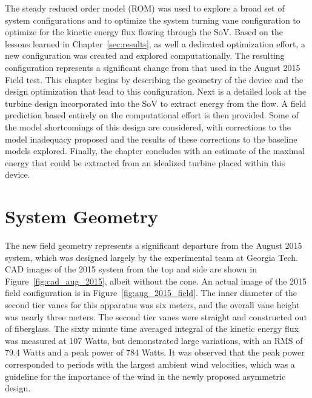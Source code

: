 \label{sec:field}

The steady reduced order model (ROM) was used to explore a broad set of
system configurations and to optimize the system turning vane
configuration to optimize for the kinetic energy flux flowing through
the SoV. Based on the lessons learned in Chapter~\ref{sec:results}, as
well a dedicated optimization effort, a new configuration was created
and explored computationally. The resulting configuration represents a
significant change from that used in the August 2015 Field test. This
chapter begins by describing the geometry of the device and the design
optimization that lead to this configuration. Next is a detailed look
at the turbine design incorporated into the SoV to extract energy from
the flow. A field prediction based entirely on the computational effort is
then provided. Some of the model shortcomings of this design are
considered, with corrections to the model inadequacy proposed and the
results of these corrections to the baseline models explored. Finally,
the chapter concludes with an estimate of the maximal energy that could
be extracted from an idealized turbine placed within this device.   

\section{System Geometry}

The new field geometry represents a significant departure from
the August 2015 system, which was designed largely by the experimental
team at Georgia Tech. CAD images of the 2015 system from the top and
side are shown in Figure~\ref{fig:cad_aug_2015}, albeit without the
cone. An actual image of the 2015 field configuration is in
Figure~\ref{fig:aug_2015_field}. The inner diameter of the second tier
vanes for this apparatus was six meters, and the overall vane height was
nearly three meters. The second tier vanes were straight and constructed
out of fiberglass. The sixty minute time averaged integral of the
kinetic energy flux was measured at 107 Watts, but demonstrated large
variations, with an RMS of 79.4 Watts and a peak power of 784 Watts. It
was observed that the peak power corresponded to periods with the
largest ambient wind velocities, which was a guideline for the
importance of the wind in the newly proposed asymmetric design. 

%
%
% 


